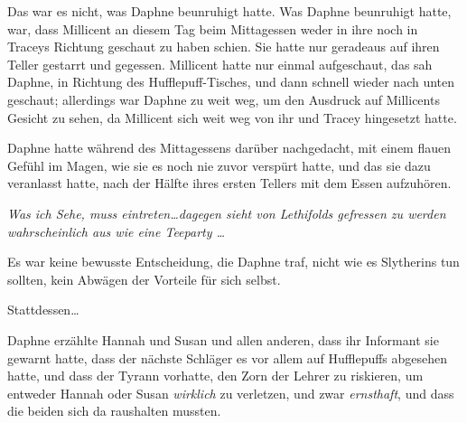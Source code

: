 Das war es nicht, was Daphne beunruhigt hatte. Was Daphne beunruhigt hatte, war, dass Millicent an diesem Tag beim Mittagessen weder in ihre noch in Traceys Richtung geschaut zu haben schien. Sie hatte nur geradeaus auf ihren Teller gestarrt und gegessen. Millicent hatte nur einmal aufgeschaut, das sah Daphne, in Richtung des Hufflepuff-Tisches, und dann schnell wieder nach unten geschaut; allerdings war Daphne zu weit weg, um den Ausdruck auf Millicents Gesicht zu sehen, da Millicent sich weit weg von ihr und Tracey hingesetzt hatte.

Daphne hatte während des Mittagessens darüber nachgedacht, mit einem flauen Gefühl im Magen, wie sie es noch nie zuvor verspürt hatte, und das sie dazu veranlasst hatte, nach der Hälfte ihres ersten Tellers mit dem Essen aufzuhören.

\emph{Was ich Sehe, muss eintreten…dagegen sieht von Lethifolds gefressen zu werden wahrscheinlich aus wie eine Teeparty …}

Es war keine bewusste Entscheidung, die Daphne traf, nicht wie es Slytherins tun sollten, kein Abwägen der Vorteile für sich selbst.

Stattdessen…

Daphne erzählte Hannah und Susan und allen anderen, dass ihr Informant sie gewarnt hatte, dass der nächste Schläger es vor allem auf Hufflepuffs abgesehen hatte, und dass der Tyrann vorhatte, den Zorn der Lehrer zu riskieren, um entweder Hannah oder Susan \emph{wirklich} zu verletzen, und zwar \emph{ernsthaft}, und dass die beiden sich da raushalten mussten.

